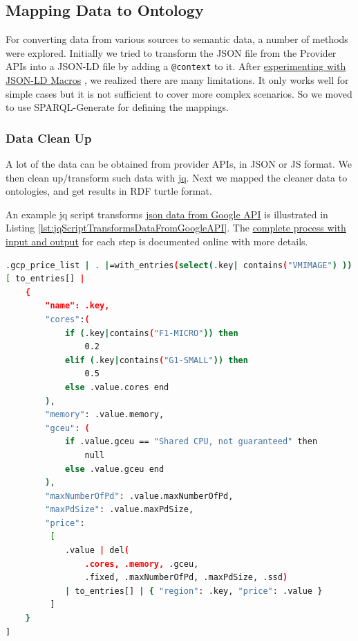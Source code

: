\subsection{Mapping Data to Ontology}
For converting data from various sources to semantic data,
a number of methods were explored.
Initially we tried to transform the JSON file from the Provider APIs into a JSON-LD file by adding a \texttt{@context} to it.
After \href{https://miranda-zhang.github.io/cloud-computing-schema/json-ld-macros/gcloud.html}{experimenting with JSON-LD Macros} \cite{json-ld-macros}, we realized there are many limitations.
It only works well for simple cases but it is not sufficient to cover more complex scenarios.
So we moved to use SPARQL-Generate \cite{lefrancois_eswc_2017,sparql-generate}
for defining the mappings.

\subsubsection{Data Clean Up}
A lot of the data can be obtained from provider APIs,
in JSON or JS format.
We then clean up/transform such data with \href{https://stedolan.github.io/jq/}{jq}.
Next we mapped the cleaner data to ontologies,
and get results in RDF turtle format.

An example jq script transforms
\href{https://cloudpricingcalculator.appspot.com/static/data/pricelist.json}{json data from Google API}
is illustrated in Listing \ref{lst:jqScriptTransformsDataFromGoogleAPI}.
The \href{https://github.com/miranda-zhang/cloud-computing-schema/blob/master/example/gcloud/compute.md}{complete process with input and output} for each step is documented online with more details.

\begin{lstlisting}[caption={jq script transforms data from Google API},label={lst:jqScriptTransformsDataFromGoogleAPI},language=bash]
.gcp_price_list | . |=with_entries(select(.key| contains("VMIMAGE") )) | 
[ to_entries[] | 
    {
        "name": .key,
        "cores":(
            if (.key|contains("F1-MICRO")) then
                0.2 
            elif (.key|contains("G1-SMALL")) then
                0.5
            else .value.cores end
        ),
        "memory": .value.memory,
        "gceu": (
            if .value.gceu == "Shared CPU, not guaranteed" then
                null
            else .value.gceu end
        ),
        "maxNumberOfPd": .value.maxNumberOfPd,
        "maxPdSize": .value.maxPdSize,
        "price": 
         [ 
            .value | del(
                .cores, .memory, .gceu,
                .fixed, .maxNumberOfPd, .maxPdSize, .ssd)
            | to_entries[] | { "region": .key, "price": .value }
         ] 
    } 
]
\end{lstlisting}

